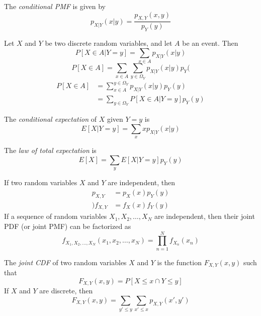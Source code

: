 The \emph{conditional PMF} is given by
\begin{equation}
    p_{X|Y}(x|y) = \frac{p_{X,Y}(x,y)}{p_{Y}(y)}
\end{equation}

Let $X$ and $Y$ be two discrete random variables, and
let $A$ be an event. Then
\begin{equation}
    P[X\in A | Y = y] = \sum_{x\in A} p_{X|Y}(x|y)
\end{equation}
\begin{equation}
    P[X\in A] = \sum_{x \in A} \sum_{y \in \Omega_Y} p_{X|Y}(x|y)p_Y(
\end{equation}
\begin{align}
    P[X \in A] & = \sum_{x \in A}^{y \in \Omega_Y} p_{X|Y}(x|y)p_Y(y) \\
               & = \sum_{y\in \Omega_Y} P[X\in A|Y = y]p_Y(y)
\end{align}

The \emph{conditional expectation} of $X$ given $Y=y$ is
\begin{equation}
    E[X|Y=y] = \sum_{x} xp_{X|Y}(x|y)
\end{equation}

The \emph{law of total expectation} is
\begin{equation}
    E[X] = \sum_{y}E[X|Y=y]p_Y(y)
\end{equation}

If two random variables $X$ and $Y$ are independent,
then
\begin{align}
    p_{X,Y}  & = p_X(x)p_Y(y) \\)
    f_{X, Y} & = f_X(x)f_Y(y)
\end{align}
If a sequence of random variables
$X_1, X_2, \dots, X_N$ are independent,
then their joint PDF (or joint PMF) can be
factorized as
\begin{equation}
    f_{X_1,X_2,\dots,X_N}\left(x_1,x_2,\dots,x_N\right) = \prod_{n=1}^{N}f_{X_n}(x_n)
\end{equation}

The \emph{joint CDF} of two random variables
$X$ and $Y$ is the function $F_{X,Y}(x,y)$ such
that
\begin{equation}
    F_{X,Y}(x,y) = P\left[X \leq x \cap Y \leq y\right]
\end{equation}
If $X$ and $Y$ are discrete, then
\begin{equation}
    F_{X,Y}(x,y) = \sum_{y'\leq y}\sum_{x' \leq x} p_{X,Y}(x',y')
\end{equation}

